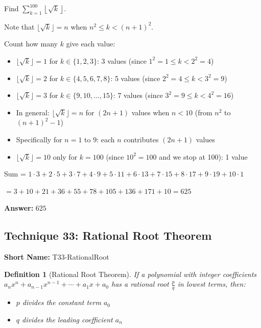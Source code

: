 \documentclass[12pt]{article}
\newtheorem{definition}{Definition}[section]
\newenvironment{problem}[1]
{\begin{tcolorbox}[colback=blue!5!white,colframe=blue!75!black,title={#1}]}{\end{tcolorbox}}
\newenvironment{solution}
{\begin{tcolorbox}[colback=green!5!white,colframe=green!75!black,title={Solution}]}{\end{tcolorbox}}
\begin{document}
\begin{problem}{Example: Sum of Floor Functions}
Find $\sum_{k=1}^{100} \left\lfloor \sqrt{k} \right\rfloor$.
\end{problem}

\begin{solution}
Note that $\lfloor \sqrt{k} \rfloor = n$ when $n^2 \leq k < (n+1)^2$.

Count how many $k$ give each value:
\begin{itemize}
    \item $\lfloor \sqrt{k} \rfloor = 1$ for $k \in \{1, 2, 3\}$: 3 values (since $1^2 = 1 \leq k < 2^2 = 4$)
    \item $\lfloor \sqrt{k} \rfloor = 2$ for $k \in \{4, 5, 6, 7, 8\}$: 5 values (since $2^2 = 4 \leq k < 3^2 = 9$)
    \item $\lfloor \sqrt{k} \rfloor = 3$ for $k \in \{9, 10, \ldots, 15\}$: 7 values (since $3^2 = 9 \leq k < 4^2 = 16$)
    \item In general: $\lfloor \sqrt{k} \rfloor = n$ for $(2n+1)$ values when $n < 10$ (from $n^2$ to $(n+1)^2 - 1$)
    \item Specifically for $n = 1$ to $9$: each $n$ contributes $(2n+1)$ values
    \item $\lfloor \sqrt{k} \rfloor = 10$ only for $k = 100$ (since $10^2 = 100$ and we stop at 100): 1 value
\end{itemize}

Sum = $1 \cdot 3 + 2 \cdot 5 + 3 \cdot 7 + 4 \cdot 9 + 5 \cdot 11 + 6 \cdot 13 + 7 \cdot 15 + 8 \cdot 17 + 9 \cdot 19 + 10 \cdot 1$

$= 3 + 10 + 21 + 36 + 55 + 78 + 105 + 136 + 171 + 10 = 625$

\textbf{Answer:} $625$
\end{solution}

\subsection{Technique 33: Rational Root Theorem}
\textbf{Short Name:} T33-RationalRoot

\begin{definition}[Rational Root Theorem]
If a polynomial with integer coefficients $a_nx^n + a_{n-1}x^{n-1} + \cdots + a_1x + a_0$ has a rational root $\frac{p}{q}$ in lowest terms, then:
\begin{itemize}
    \item $p$ divides the constant term $a_0$
    \item $q$ divides the leading coefficient $a_n$
\end{itemize}
\end{definition}
\end{document}
